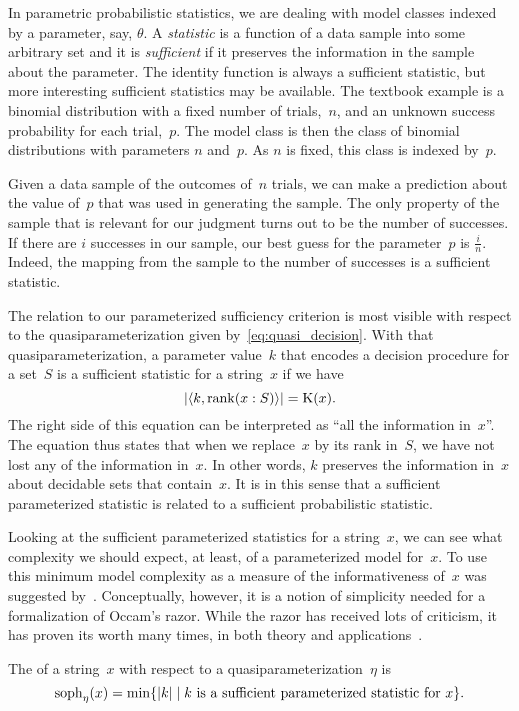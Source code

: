 \begin{example}
  In parametric probabilistic statistics, we are dealing with model classes indexed by a parameter, say, $\theta$.
  A \emph{statistic} is a function of a data sample into some arbitrary set and it is \emph{sufficient} if it preserves the information in the sample about the parameter.
  The identity function is always a sufficient statistic, but more interesting sufficient statistics may be available.
  The textbook example is a binomial distribution with a fixed number of trials,~$n$, and an unknown success probability for each trial,~$p$.
  The model class is then the class of binomial distributions with parameters $n$ and~$p$.
  As $n$ is fixed, this class is indexed by~$p$.

  Given a data sample of the outcomes of~$n$ trials, we can make a prediction about the value of~$p$ that was used in generating the sample.
  The only property of the sample that is relevant for our judgment turns out to be the number of successes.
  If there are $i$ successes in our sample, our best guess for the parameter~$p$ is $\frac{i}{n}$.
  Indeed, the mapping from the sample to the number of successes is a sufficient statistic.

  The relation to our parameterized sufficiency criterion is most visible with respect to the quasiparameterization given by~\eqref{eq:quasi_decision}.
  With that quasiparameterization, a parameter value~$k$ that encodes a decision procedure for a set~$S$ is a sufficient statistic for a string~$x$ if we have
  \begin{equation*}
    {\lvert{\langle k, \operatorname{rank}(x : S)\rangle}\rvert} = \operatorname{K}(x).
  \end{equation*}
  The right side of this equation can be interpreted as \enquote{all the information in~$x$}.
  The equation thus states that when we replace~$x$ by its rank in~$S$, we have not lost any of the information in~$x$.
  In other words, $k$ preserves the information in~$x$ about decidable sets that contain~$x$.
  It is in this sense that a sufficient parameterized statistic is related to a sufficient probabilistic statistic.
\end{example}

Looking at the sufficient parameterized statistics for a string~$x$, we can see what complexity we should expect, at least, of a parameterized model for~$x$.
To use this minimum model complexity as a measure of the informativeness of~$x$ was suggested by~\textcite{koppel1988structure}.
Conceptually, however, it is a notion of simplicity needed for a formalization of Occam's razor.
While the razor has received lots of criticism, it has proven its worth many times, in both theory and applications~\parencite{grunwald2007minimum}.
\begin{definition}
  The  of a string~$x$ with respect to a quasiparameterization~$\eta$ is
  \begin{equation*}
    \operatorname{soph}_\eta(x) = \min\{{\lvert k\rvert} \;|\; \text{$k$ is a sufficient parameterized statistic for $x$}\}.
  \end{equation*}
\end{definition}

